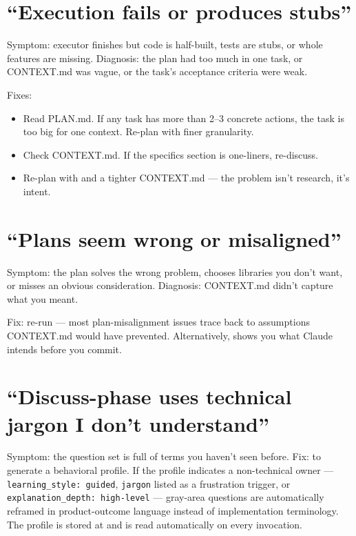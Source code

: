 \documentclass[11pt,letterpaper,openany]{book}
\begin{document}
\section{``Execution fails or produces stubs''}

Symptom: executor finishes but code is half-built, tests are stubs, or whole features are missing. Diagnosis: the plan had too much in one task, or CONTEXT.md was vague, or the task's acceptance criteria were weak.

Fixes:
\begin{itemize}[itemsep=2pt]
  \item Read PLAN.md. If any task has more than 2--3 concrete actions, the task is too big for one context. Re-plan with finer granularity.
  \item Check CONTEXT.md. If the specifics section is one-liners, re-discuss.
  \item Re-plan with  and a tighter CONTEXT.md --- the problem isn't research, it's intent.
\end{itemize}

\section{``Plans seem wrong or misaligned''}

Symptom: the plan solves the wrong problem, chooses libraries you don't want, or misses an obvious consideration. Diagnosis: CONTEXT.md didn't capture what you meant.

Fix: re-run  --- most plan-misalignment issues trace back to assumptions CONTEXT.md would have prevented. Alternatively,  shows you what Claude intends before you commit.

\section{``Discuss-phase uses technical jargon I don't understand''}

Symptom: the question set is full of terms you haven't seen before. Fix:  to generate a behavioral profile. If the profile indicates a non-technical owner --- \texttt{learning\_style: guided}, \texttt{jargon} listed as a frustration trigger, or \texttt{explanation\_depth: high-level} --- gray-area questions are automatically reframed in product-outcome language instead of implementation terminology. The profile is stored at  and is read automatically on every  invocation.
\end{document}
